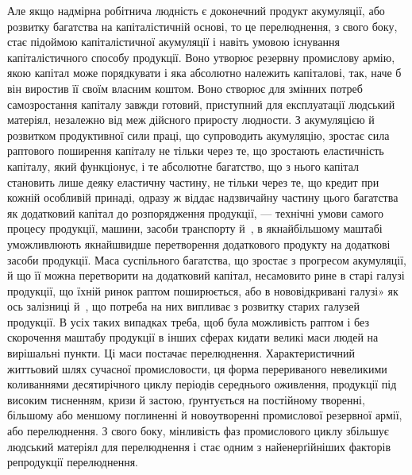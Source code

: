 Але якщо надмірна робітнича людність є доконечний продукт
акумуляції, або розвитку багатства на капіталістичній основі,
то це перелюднення, з свого боку, стає підоймою капіталістичної
акумуляції і навіть умовою існування капіталістичного способу
продукції. Воно утворює резервну промислову армію, якою капітал
може порядкувати і яка абсолютно належить капіталові,
так, наче б він виростив її своїм власним коштом. Воно створює
для змінних потреб самозростання капіталу завжди готовий,
приступний для експлуатації людський матеріял, незалежно
від меж дійсного приросту людности. З акумуляцією й розвитком
продуктивної сили праці, що супроводить акумуляцію,
зростає сила раптового поширення капіталу не тільки через те,
що зростають еластичність капіталу, який функціонує, і те абсолютне
багатство, що з нього капітал становить лише деяку
еластичну частину, не тільки через те, що кредит при кожній
особливій принаді, одразу ж віддає надзвичайну частину цього
багатства як додатковий капітал до розпорядження продукції,
— технічні умови самого процесу продукції, машини, засоби
транспорту й~, в якнайбільшому маштабі уможливлюють
якнайшвидше перетворення додаткового продукту на
додаткові засоби продукції. Маса суспільного багатства, що зростає
з прогресом акумуляції, й що її можна перетворити на додатковий
капітал, несамовито рине в старі галузі продукції, що
їхній ринок раптом поширюється, або в нововідкривані галузі»
як ось залізниці й~, що потреба на них випливає з розвитку
старих галузей продукції. В усіх таких випадках треба, щоб була
можливість раптом і без скорочення маштабу продукції в інших
сферах кидати великі маси людей на вирішальні пункти. Ці
маси постачає перелюднення. Характеристичний життьовий шлях
сучасної промисловости, ця форма перериваного невеликими
коливаннями десятирічного циклу періодів середнього оживлення,
продукції під високим тисненням, кризи й застою, ґрунтується
на постійному творенні, більшому або меншому поглиненні й
новоутворенні промислової резервної армії, або перелюднення.
З свого боку, мінливість фаз промислового циклу збільшує
людський матеріял для перелюднення і стає одним з найенерґійніших
факторів репродукції перелюднення.

